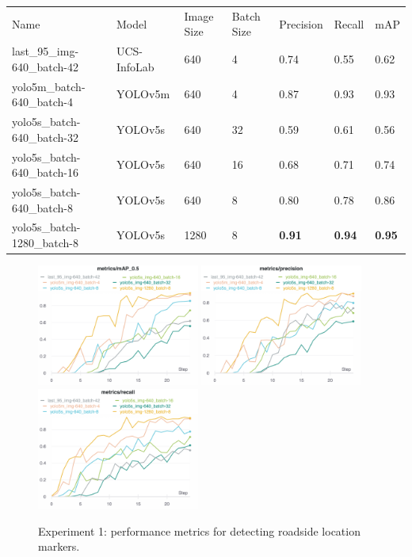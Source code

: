 \begin{table}[h]
\begin{tabular}{lllllll}
Name                        & Model       & Image Size & Batch Size & Precision & Recall & mAP  \\
last\_95\_img-640\_batch-42 & UCS-InfoLab & 640        & 4          & 0.74      & 0.55   & 0.62 \\
yolo5m\_batch-640\_batch-4  & YOLOv5m     & 640        & 4          & 0.87      & 0.93   & 0.93 \\
yolo5s\_batch-640\_batch-32 & YOLOv5s     & 640        & 32         & 0.59      & 0.61   & 0.56 \\
yolo5s\_batch-640\_batch-16 & YOLOv5s     & 640        & 16         & 0.68      & 0.71   & 0.74 \\
yolo5s\_batch-640\_batch-8  & YOLOv5s     & 640        & 8          & 0.80      & 0.78   & 0.86 \\
yolo5s\_batch-1280\_batch-8 & YOLOv5s     & 1280       & 8           & \textbf{0.91} & \textbf{0.94} & \textbf{0.95}
\end{tabular}
\end{table}


\begin{figure}[h]
\begin{center}
\includegraphics[height=4cm,keepaspectratio]{images/5_multimodal_fusion/exp-1_mAP.png}
\includegraphics[height=4cm,keepaspectratio]{images/5_multimodal_fusion/exp-1_precision.png}
\includegraphics[height=4cm,keepaspectratio]{images/5_multimodal_fusion/exp-1_recall.png}
\end{center}
\caption{Experiment 1: performance metrics for detecting roadside location markers.}
\end{figure}


